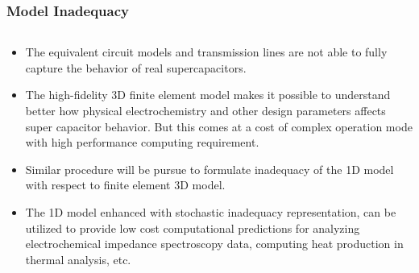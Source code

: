\documentclass[8pt]{beamer}
\begin{document}
\begin{frame}
\frametitle{Model Inadequacy}
\vfill

\begin{columns}
\begin{column}{.50\textwidth}
\begin{block}{}
\begin{itemize}

\item The equivalent circuit models and transmission lines are not able to fully capture the behavior of real supercapacitors. 

\item The high-fidelity 3D finite element model makes it possible to understand better how physical electrochemistry and other design parameters affects super capacitor behavior.  But this comes at a cost of complex operation mode with high performance computing requirement.  

\item Similar procedure will be pursue to formulate inadequacy of the 1D model with respect to finite element 3D model.

\item The 1D model enhanced with stochastic inadequacy representation, can be utilized to provide low cost computational predictions for analyzing electrochemical impedance spectroscopy data, computing heat production in thermal analysis, etc. 

\end{itemize}


\end{block}
\end{column}
\end{columns}
\end{frame}
\end{document}
